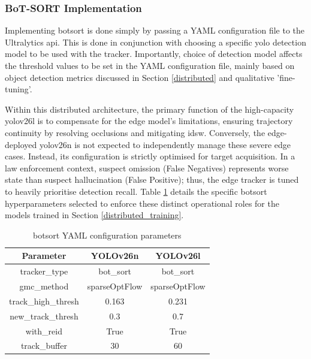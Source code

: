 \documentclass{report_template_oxford}
\begin{document}
\subsubsection{BoT-SORT Implementation}\label{botsort yaml}
Implementing \gls{botsort} is done simply by passing a YAML configuration file to the Ultralytics \gls{api}\cite{ultralytics_tracking}. This is done in conjunction with choosing a specific \gls{yolo} detection model to be used with the tracker. Importantly, choice of detection model affects the threshold values to be set in the YAML  configuration file, mainly based on object detection metrics discussed in Section \ref{distributed} and qualitative 'fine-tuning'. 

Within this distributed architecture, the primary function of the high-capacity \gls{yolo}v26l is to compensate for the edge model's limitations, ensuring trajectory continuity by resolving occlusions and mitigating \gls{idsw}. Conversely, the edge-deployed \gls{yolo}v26n is not expected to independently manage these severe edge cases. Instead, its configuration is strictly optimised for target acquisition. In a law enforcement context, suspect omission (False Negatives) represents worse state than suspect hallucination (False Positive); thus, the edge tracker is tuned to heavily prioritise detection recall. Table \ref{tab:yaml_config} details the specific \gls{botsort} hyperparameters selected to enforce these distinct operational roles for the models trained in Section \ref{distributed_training}.


\begin{table}[H]
    \centering
    \begin{tabular}{|c|c|c|}
    \hline
       Parameter  & YOLOv26n & YOLOv26l\\
        \hline
       tracker\_type & bot\_sort & bot\_sort\\
        \hline
       gmc\_method & sparseOptFlow & sparseOptFlow\\
        \hline
       track\_high\_thresh & 0.163 & 0.231\\
        \hline
       new\_track\_thresh & 0.3 & 0.7\\
        \hline
       with\_reid  & True & True\\
        \hline
       track\_buffer & 30 & 60\\
    \hline
    \end{tabular}
    \caption{\gls{botsort} YAML configuration parameters}
    \label{tab:yaml_config}
\end{table}
\end{document}
